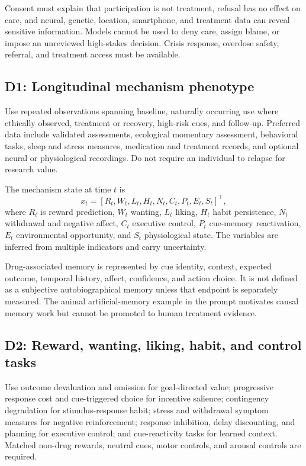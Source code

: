 \documentclass[conference]{IEEEtran}
\begin{document}
Consent must explain that participation is not treatment, refusal has no effect on care, and neural, genetic, location, smartphone, and treatment data can reveal sensitive information. Models cannot be used to deny care, assign blame, or impose an unreviewed high-stakes decision. Crisis response, overdose safety, referral, and treatment access must be available.

\subsection{D1: Longitudinal mechanism phenotype}
Use repeated observations spanning baseline, naturally occurring use where ethically observed, treatment or recovery, high-risk cues, and follow-up. Preferred data include validated assessments, ecological momentary assessment, behavioral tasks, sleep and stress measures, medication and treatment records, and optional neural or physiological recordings. Do not require an individual to relapse for research value.

The mechanism state at time $t$ is
\begin{equation}
x_t=[R_t,W_t,L_t,H_t,N_t,C_t,P_t,E_t,S_t]^{\top},
\label{eq:mechanism_state}
\end{equation}
where $R_t$ is reward prediction, $W_t$ wanting, $L_t$ liking, $H_t$ habit persistence, $N_t$ withdrawal and negative affect, $C_t$ executive control, $P_t$ cue-memory reactivation, $E_t$ environmental opportunity, and $S_t$ physiological state. The variables are inferred from multiple indicators and carry uncertainty.

Drug-associated memory is represented by cue identity, context, expected outcome, temporal history, affect, confidence, and action choice. It is not defined as a subjective autobiographical memory unless that endpoint is separately measured. The animal artificial-memory example in the prompt motivates causal memory work but cannot be promoted to human treatment evidence.

\subsection{D2: Reward, wanting, liking, habit, and control tasks}
Use outcome devaluation and omission for goal-directed value; progressive response cost and cue-triggered choice for incentive salience; contingency degradation for stimulus-response habit; stress and withdrawal symptom measures for negative reinforcement; response inhibition, delay discounting, and planning for executive control; and cue-reactivity tasks for learned context. Matched non-drug rewards, neutral cues, motor controls, and arousal controls are required.
\end{document}
